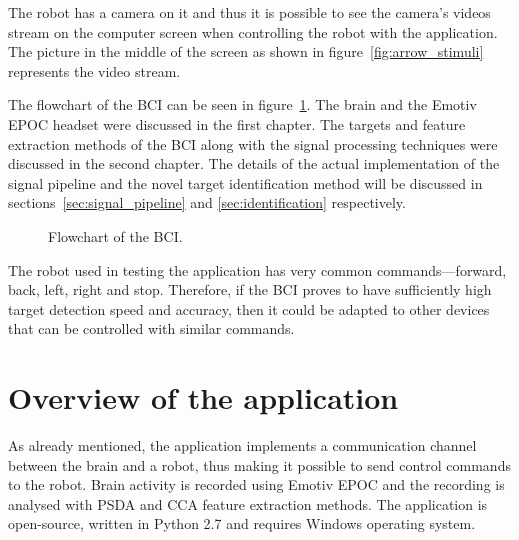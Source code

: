 The robot has a camera on it and thus it is possible to see the camera's videos stream on the computer screen when controlling the robot with the application. The picture in the middle of the screen as shown in figure~\ref{fig:arrow_stimuli} represents the video stream.

The flowchart of the \gls{BCI} can be seen in figure~\ref{fig:whole_bci}. The brain and the Emotiv EPOC headset were discussed in the first chapter. The \glspl{target} and \gls{feature extraction} methods of the \gls{BCI} along with the signal processing techniques were discussed in the second chapter. The details of the actual implementation of the signal pipeline and the novel target identification method will be discussed in sections~\ref{sec:signal_pipeline} and \ref{sec:identification} respectively.

\begin{figure}[h!]
	\centering
	
	\caption{Flowchart of the BCI.}
	\label{fig:whole_bci}
\end{figure}

The robot used in testing the application has very common commands---forward, back, left, right and stop. Therefore, if the \gls{BCI} proves to have sufficiently high \gls{target} detection speed and accuracy, then it could be adapted to other devices that can be controlled with similar commands.

\section{Overview of the application}
\label{sec:application}

As already mentioned, the application implements a communication channel between the brain and a robot, thus making it possible to send control commands to the robot. Brain activity is recorded using Emotiv EPOC and the recording is analysed with \gls{PSDA} and \gls{CCA} \gls{feature extraction} methods. The application is open-source, written in Python 2.7 and requires Windows operating system.

